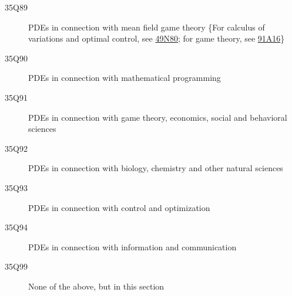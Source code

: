 \begin{description}
\item [35Q89]\label{35Q89} PDEs in connection with mean field game theory \{For calculus of variations and optimal control, see \hyperref[49N80]{49N80}; for game theory, see \hyperref[91A16]{91A16}\}
\item [35Q90]\label{35Q90} PDEs in connection with mathematical programming
\item [35Q91]\label{35Q91} PDEs in connection with game theory, economics, social and behavioral sciences
\item [35Q92]\label{35Q92} PDEs in connection with biology, chemistry and other natural sciences
\item [35Q93]\label{35Q93} PDEs in connection with control and optimization
\item [35Q94]\label{35Q94} PDEs in connection with information and communication
\item [35Q99]\label{35Q99} None of the above, but in this section
\end{description}
